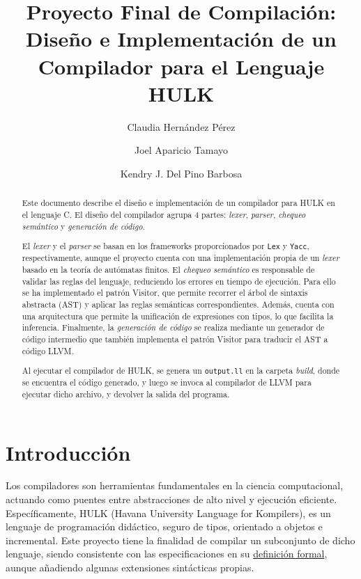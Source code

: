 \documentclass{llncs}
\title{Proyecto Final de Compilación: Diseño e Implementación de un Compilador para el Lenguaje HULK}
\author{Claudia Hernández Pérez \and Joel Aparicio Tamayo \and Kendry J. Del Pino Barbosa}
\institute{Facultad de Matemática y Computación, Universidad de La Habana}
\begin{document}
\maketitle

\begin{abstract}
Este documento describe el diseño e implementación de un compilador para HULK en el lenguaje C. El 
diseño del compilador agrupa 4 partes: \textit{lexer}, \textit{parser}, \textit{chequeo semántico} y \textit{generación de código}.

El \textit{lexer} y el \textit{parser} se basan en los frameworks proporcionados por \texttt{Lex} y \texttt{Yacc}, respectivamente, aunque el proyecto cuenta con
una implementación propia de un \textit{lexer} basado en la teoría de autómatas finitos. El \textit{chequeo semántico} es responsable de validar las reglas del lenguaje,
reduciendo los errores en tiempo de ejecución. Para ello se ha implementado el patrón Visitor, que permite recorrer el árbol de sintaxis abstracta (AST) y aplicar las reglas semánticas correspondientes. Además,
cuenta con una arquitectura que permite la unificación de expresiones con tipos, lo que facilita la inferencia. Finalmente, la \textit{generación de código} se realiza mediante un generador de código intermedio que
también implementa el patrón Visitor para traducir el AST a código LLVM.

Al ejecutar el compilador de HULK, se genera un \texttt{output.ll} en la carpeta \textit{build}, donde se encuentra 
el código generado, y luego se invoca al compilador de LLVM para ejecutar dicho archivo, y devolver la salida del programa.
\vspace{10pt}
\end{abstract}

\section{Introducción}
Los compiladores son herramientas fundamentales en la ciencia computacional, actuando como puentes entre abstracciones de alto nivel y ejecución eficiente. Específicamente, HULK (Havana University Language for Kompilers),
es un lenguaje de programación didáctico, seguro de tipos, orientado a objetos e incremental. Este proyecto tiene la finalidad de compilar un subconjunto de dicho 
lenguaje, siendo consistente con las especificaciones en su \href{https://matcom.in/hulk/guide/intro}{definición formal}, aunque añadiendo algunas extensiones sintácticas propias.
\end{document}
